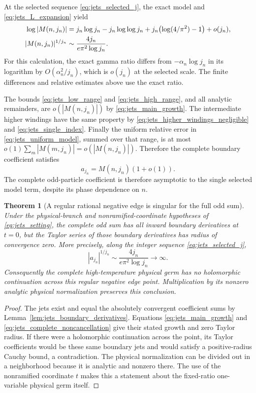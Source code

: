 \documentclass[11pt]{article}
\numberwithin{equation}{section}
\newtheorem{theorem}{Theorem}[section]
\theoremstyle{definition}
\begin{document}
At the selected sequence \eqref{eq:jets_selected_j}, the exact
model and \eqref{eq:jets_L_expansion} yield
\begin{align}
 \log|M(n,j_n)|
 &=j_n\log j_n-j_n\log\log j_n
   +j_n\bigl(\log(4/\pi^2)-1\bigr)+o(j_n),
 \label{eq:jets_main_growth}\\
 |M(n,j_n)|^{1/j_n}
 &\sim\frac{4j_n}{e\pi^2\log j_n}.
 \notag
\end{align}
For this calculation, the exact gamma ratio differs from
$-\alpha_n\log j_n$ in its logarithm by $O(\alpha_n^2/j_n)$,
which is $o(j_n)$ at the selected scale. The finite differences and
relative estimates above use the exact ratio.

The bounds \eqref{eq:jets_low_range} and
\eqref{eq:jets_high_range}, and all analytic remainders, are
$o(|M(n,j_n)|)$ by \eqref{eq:jets_main_growth}. The intermediate
higher windings have the same property by
\eqref{eq:jets_higher_windings_negligible} and
\eqref{eq:jets_single_index}. Finally the uniform relative error
in \eqref{eq:jets_uniform_model}, summed over that range, is at
most $o(1)\sum_m|M(m,j_n)|=o(|M(n,j_n)|)$. Therefore the
complete boundary coefficient satisfies
\begin{equation}\label{eq:jets_complete_noncancellation}
 a_{j_n}=M(n,j_n)(1+o(1)).
\end{equation}
The complete odd-particle coefficient is therefore asymptotic to the
single selected model term, despite its phase dependence on $n$.

\begin{theorem}[A regular rational negative edge is singular for the full odd sum]
\label{thm:jets_negative_edge}
Under the physical-branch and nonramified-coordinate hypotheses
of \eqref{eq:jets_setting}, the complete odd sum has all inward
boundary derivatives at $t=0$, but the Taylor series of those
boundary derivatives has radius of convergence zero. More
precisely, along the integer sequence \eqref{eq:jets_selected_j},
\[
 |a_{j_n}|^{1/j_n}\sim\frac{4j_n}{e\pi^2\log j_n}\longrightarrow\infty.
\]
Consequently the complete high-temperature physical germ has no
holomorphic continuation across this regular negative edge
point. Multiplication by its nonzero analytic physical
normalization preserves this conclusion.
\end{theorem}

\begin{proof}
The jets exist and equal the absolutely convergent coefficient
sums by Lemma~\ref{lem:jets_boundary_derivatives}. Equations
\eqref{eq:jets_main_growth} and
\eqref{eq:jets_complete_noncancellation} give their stated
growth and zero Taylor radius. If there were a holomorphic
continuation across the point, its Taylor coefficients would be
these same boundary jets and would satisfy a positive-radius
Cauchy bound, a contradiction. The physical normalization can
be divided out in a neighborhood because it is analytic and
nonzero there. The use of the nonramified coordinate $t$ makes
this a statement about the fixed-ratio one-variable physical
germ itself.
\end{proof}
\end{document}
